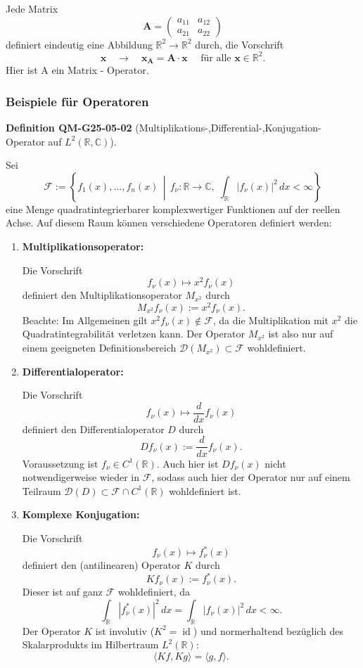 \documentclass[10pt, letterpaper]{article}
\newcommand{\R}{\mathbb{R}}
\newcommand{\C}{\mathbb{C}}
\newcommand{\CustomHeading}[3]{%
  \par\medskip\noindent%
  \textbf{#1 #2} \textnormal{(#3)}.\enskip%
}
\newenvironment{DEF}[2]{\begin{unitbox}\CustomHeading{Definition}{#1}{#2}}{\end{unitbox}}
\begin{document}
Jede Matrix
$$
\mathbf{A}=\left(\begin{array}{ll}
a_{11} & a_{12} \\
a_{21} & a_{22}
\end{array}\right)
$$
definiert eindeutig eine Abbildung $\mathbb{R}^{2} \rightarrow \mathbb{R}^{2}$ durch, die Vorschrift
$$
\mathbf{x} \quad \rightarrow \quad \mathbf{x}_{\mathbf{A}}=\mathbf{A} \cdot \mathbf{x} \quad \text { für alle } \mathbf{x} \in \mathbb{R}^{2} .
$$
Hier ist A ein Matrix - Operator.


\subsubsection*{Beispiele für Operatoren}


\begin{DEF}{QM-G25-05-02}{Multiplikations-,Differential-,Konjugation-Operator auf $L^2(\R,\C)$}
Sei
\[
\mathcal{F} := \left\{ f_1(x), \dotsc, f_n(x) \,\middle|\, f_\nu : \mathbb{R} \to \mathbb{C}, \; \int_{\mathbb{R}} |f_\nu(x)|^2 \, dx < \infty \right\}
\]
eine Menge quadratintegrierbarer komplexwertiger Funktionen auf der reellen Achse. Auf diesem Raum können verschiedene Operatoren definiert werden:

\begin{enumerate}
  \item \textbf{Multiplikationsoperator:}

  Die Vorschrift
  \[
  f_\nu(x) \mapsto x^2 f_\nu(x)
  \]
  definiert den Multiplikationsoperator $M_{x^2}$ durch
  \[
  M_{x^2} f_\nu(x) := x^2 f_\nu(x).
  \]
  Beachte: Im Allgemeinen gilt $x^2 f_\nu(x) \notin \mathcal{F}$, da die Multiplikation mit $x^2$ die Quadratintegrabilität verletzen kann. Der Operator $M_{x^2}$ ist also nur auf einem geeigneten Definitionsbereich $\mathcal{D}(M_{x^2}) \subset \mathcal{F}$ wohldefiniert.

  \item \textbf{Differentialoperator:}

  Die Vorschrift
  \[
  f_\nu(x) \mapsto \frac{d}{dx} f_\nu(x)
  \]
  definiert den Differentialoperator $D$ durch
  \[
  D f_\nu(x) := \frac{d}{dx} f_\nu(x).
  \]
  Voraussetzung ist $f_\nu \in C^1(\mathbb{R})$. Auch hier ist $D f_\nu(x)$ nicht notwendigerweise wieder in $\mathcal{F}$, sodass auch hier der Operator nur auf einem Teilraum $\mathcal{D}(D) \subset \mathcal{F} \cap C^1(\mathbb{R})$ wohldefiniert ist.

  \item \textbf{Komplexe Konjugation:}

  Die Vorschrift
  \[
  f_\nu(x) \mapsto f_\nu^*(x)
  \]
  definiert den (antilinearen) Operator $K$ durch
  \[
  K f_\nu(x) := f_\nu^*(x).
  \]
  Dieser ist auf ganz $\mathcal{F}$ wohldefiniert, da
  \[
  \int_{\mathbb{R}} |f_\nu^*(x)|^2 \, dx = \int_{\mathbb{R}} |f_\nu(x)|^2 \, dx < \infty.
  \]
  Der Operator $K$ ist involutiv ($K^2 = \operatorname{id}$) und normerhaltend bezüglich des Skalarprodukts im Hilbertraum $L^2(\mathbb{R})$:
  \[
  \langle Kf, Kg \rangle = \langle g, f \rangle.
  \]
  
\end{enumerate}
\end{DEF}
\end{document}
